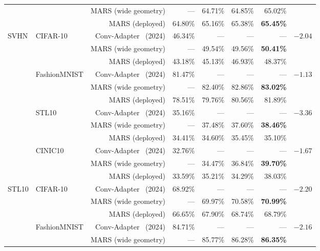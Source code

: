 \documentclass[12pt, a4paper]{report}
\numberwithin{equation}{chapter}
\numberwithin{figure}{chapter}
\numberwithin{table}{chapter}
\numberwithin{algorithm}{chapter}
\begin{document}
\begin{table}[H]
\begin{tabular}{llrrrrrc}
 & & MARS (wide geometry) & --- & 64.71\% & 64.85\% & 65.02\% & \\
 & & MARS (deployed) & 64.80\% & 65.16\% & 65.38\% & \textbf{65.45\%} & \\
\midrule
\multirow{12}{*}{SVHN} & \multirow{3}{*}{CIFAR-10} & Conv-Adapter~\cite{Chen2024ConvAdapter} (2024) & 46.34\% & --- & --- & --- & \multirow{3}{*}{$-2.04$} \\
 & & MARS (wide geometry) & --- & 49.54\% & 49.56\% & \textbf{50.41\%} & \\
 & & MARS (deployed) & 43.18\% & 45.13\% & 46.93\% & 48.37\% & \\
\cmidrule(lr){2-8}
 & \multirow{3}{*}{FashionMNIST} & Conv-Adapter~\cite{Chen2024ConvAdapter} (2024) & 81.47\% & --- & --- & --- & \multirow{3}{*}{$-1.13$} \\
 & & MARS (wide geometry) & --- & 82.40\% & 82.86\% & \textbf{83.02\%} & \\
 & & MARS (deployed) & 78.51\% & 79.76\% & 80.56\% & 81.89\% & \\
\cmidrule(lr){2-8}
 & \multirow{3}{*}{STL10} & Conv-Adapter~\cite{Chen2024ConvAdapter} (2024) & 35.16\% & --- & --- & --- & \multirow{3}{*}{$-3.36$} \\
 & & MARS (wide geometry) & --- & 37.48\% & 37.60\% & \textbf{38.46\%} & \\
 & & MARS (deployed) & 34.41\% & 34.60\% & 35.45\% & 35.10\% & \\
\cmidrule(lr){2-8}
 & \multirow{3}{*}{CINIC10} & Conv-Adapter~\cite{Chen2024ConvAdapter} (2024) & 32.76\% & --- & --- & --- & \multirow{3}{*}{$-1.67$} \\
 & & MARS (wide geometry) & --- & 34.47\% & 36.84\% & \textbf{39.70\%} & \\
 & & MARS (deployed) & 33.59\% & 35.21\% & 34.29\% & 38.03\% & \\
\midrule
\multirow{12}{*}{STL10} & \multirow{3}{*}{CIFAR-10} & Conv-Adapter~\cite{Chen2024ConvAdapter} (2024) & 68.92\% & --- & --- & --- & \multirow{3}{*}{$-2.20$} \\
 & & MARS (wide geometry) & --- & 69.97\% & 70.58\% & \textbf{70.99\%} & \\
 & & MARS (deployed) & 66.65\% & 67.90\% & 68.74\% & 68.79\% & \\
\cmidrule(lr){2-8}
 & \multirow{3}{*}{FashionMNIST} & Conv-Adapter~\cite{Chen2024ConvAdapter} (2024) & 84.71\% & --- & --- & --- & \multirow{3}{*}{$-2.16$} \\
 & & MARS (wide geometry) & --- & 85.77\% & 86.28\% & \textbf{86.35\%} & \\

\end{tabular}
\end{table}
\end{document}
